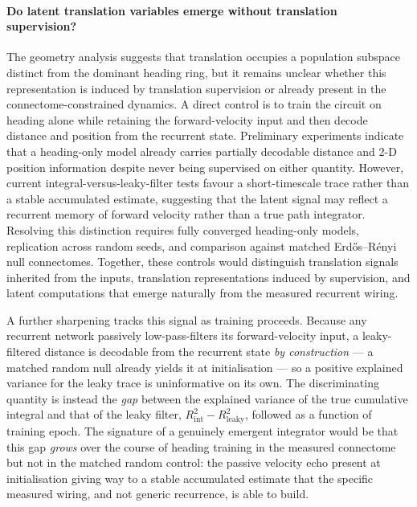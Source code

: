 \documentclass[11pt]{article}
\begin{document}
\paragraph{Do latent translation variables emerge without translation
supervision?}\label{out:latent_translation}
The geometry analysis suggests that translation occupies a population subspace
distinct from the dominant heading ring, but it remains unclear whether this
representation is induced by translation supervision or already present in the
connectome-constrained dynamics. A direct control is to train the circuit on
heading alone while retaining the forward-velocity input and then decode
distance and position from the recurrent state. Preliminary experiments
indicate that a heading-only model already carries partially decodable distance
and 2-D position information despite never being supervised on either quantity.
However, current integral-versus-leaky-filter tests favour a short-timescale
trace rather than a stable accumulated estimate, suggesting that the latent
signal may reflect a recurrent memory of forward velocity rather than a true
path integrator. Resolving this distinction requires fully converged
heading-only models, replication across random seeds, and comparison against
matched Erd\H{o}s--R\'enyi null connectomes. Together, these controls would
distinguish translation signals inherited from the inputs, translation
representations induced by supervision, and latent computations that emerge
naturally from the measured recurrent wiring.

A further sharpening tracks this signal as training proceeds. Because any
recurrent network passively low-pass-filters its forward-velocity input, a
leaky-filtered distance is decodable from the recurrent state \emph{by
construction} --- a matched random null already yields it at initialisation ---
so a positive explained variance for the leaky trace is uninformative on its
own. The discriminating quantity is instead the \emph{gap} between the explained
variance of the true cumulative integral and that of the leaky filter,
$R^2_{\mathrm{int}}-R^2_{\mathrm{leaky}}$, followed as a function of training
epoch. The signature of a genuinely emergent integrator would be that this gap
\emph{grows} over the course of heading training in the measured connectome but
not in the matched random control: the passive velocity echo present at
initialisation giving way to a stable accumulated estimate that the specific
measured wiring, and not generic recurrence, is able to build.
\end{document}
